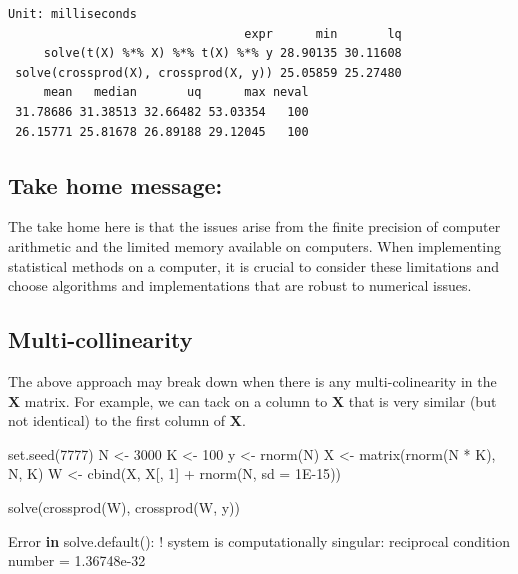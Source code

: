 \documentclass[
  letterpaper,
  DIV=11,
  numbers=noendperiod]{scrreprt}
\newenvironment{Shaded}{\begin{snugshade}}{\end{snugshade}}
\newcommand{\AttributeTok}[1]{\textcolor[rgb]{0.40,0.45,0.13}{#1}}
\newcommand{\ControlFlowTok}[1]{\textcolor[rgb]{0.00,0.23,0.31}{\textbf{#1}}}
\newcommand{\DecValTok}[1]{\textcolor[rgb]{0.68,0.00,0.00}{#1}}
\newcommand{\FloatTok}[1]{\textcolor[rgb]{0.68,0.00,0.00}{#1}}
\newcommand{\FunctionTok}[1]{\textcolor[rgb]{0.28,0.35,0.67}{#1}}
\newcommand{\NormalTok}[1]{\textcolor[rgb]{0.00,0.23,0.31}{#1}}
\newcommand{\OtherTok}[1]{\textcolor[rgb]{0.00,0.23,0.31}{#1}}
\newcommand{\SpecialCharTok}[1]{\textcolor[rgb]{0.37,0.37,0.37}{#1}}
\newcommand{\StringTok}[1]{\textcolor[rgb]{0.13,0.47,0.30}{#1}}
\begin{document}
\begin{verbatim}
Unit: milliseconds
                                 expr      min       lq
     solve(t(X) %*% X) %*% t(X) %*% y 28.90135 30.11608
 solve(crossprod(X), crossprod(X, y)) 25.05859 25.27480
     mean   median       uq      max neval
 31.78686 31.38513 32.66482 53.03354   100
 26.15771 25.81678 26.89188 29.12045   100
\end{verbatim}

\subsection{Take home message:}\label{take-home-message}

The take home here is that the issues arise from the finite precision of
computer arithmetic and the limited memory available on computers. When
implementing statistical methods on a computer, it is crucial to
consider these limitations and choose algorithms and implementations
that are robust to numerical issues.

\subsection{Multi-collinearity}\label{multi-collinearity}

The above approach may break down when there is any multi-colinearity in
the \(\boldsymbol{X}\) matrix. For example, we can tack on a column to
\(\boldsymbol{X}\) that is very similar (but not identical) to the first
column of \(\boldsymbol{X}\).

\begin{Shaded}
\begin{Highlighting}[]
\FunctionTok{set.seed}\NormalTok{(}\DecValTok{7777}\NormalTok{)}
\NormalTok{N }\OtherTok{\textless{}{-}} \DecValTok{3000}
\NormalTok{K }\OtherTok{\textless{}{-}} \DecValTok{100}
\NormalTok{y }\OtherTok{\textless{}{-}} \FunctionTok{rnorm}\NormalTok{(N)}
\NormalTok{X }\OtherTok{\textless{}{-}} \FunctionTok{matrix}\NormalTok{(}\FunctionTok{rnorm}\NormalTok{(N }\SpecialCharTok{*}\NormalTok{ K), N, K)}
\NormalTok{W }\OtherTok{\textless{}{-}} \FunctionTok{cbind}\NormalTok{(X, X[, }\DecValTok{1}\NormalTok{] }\SpecialCharTok{+} \FunctionTok{rnorm}\NormalTok{(N, }\AttributeTok{sd =} \FloatTok{1E{-}15}\NormalTok{))}
\end{Highlighting}
\end{Shaded}

\begin{Shaded}
\begin{Highlighting}[]
\FunctionTok{solve}\NormalTok{(}\FunctionTok{crossprod}\NormalTok{(W), }\FunctionTok{crossprod}\NormalTok{(W, y))}

\NormalTok{Error }\ControlFlowTok{in} \StringTok{\textasciigrave{}}\AttributeTok{solve.default()}\StringTok{\textasciigrave{}}\SpecialCharTok{:}
\SpecialCharTok{!}\NormalTok{ system is computationally singular}\SpecialCharTok{:}\NormalTok{ reciprocal condition number }\OtherTok{=} \FloatTok{1.36748e{-}32}
\end{Highlighting}
\end{Shaded}
\end{document}
